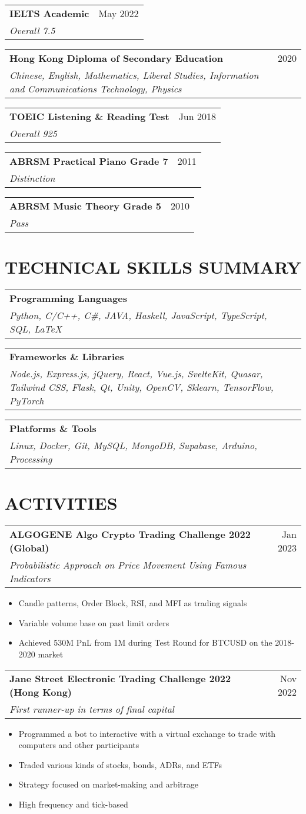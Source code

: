 \documentclass{article}
\newcommand{\jobTitle}[3]{
\begin{tabularx}{\linewidth}{ X r }
    \textbf{#1} & #2\\
    \textit{#3} &
\end{tabularx}
}
\begin{document}
\jobTitle
{IELTS Academic}
{May 2022}
{Overall 7.5}

\jobTitle
{Hong Kong Diploma of Secondary Education}
{2020}
{Chinese, English, Mathematics, Liberal Studies, Information and Communications Technology, Physics}

\jobTitle
{TOEIC Listening \& Reading Test}
{Jun 2018}
{Overall 925}

\jobTitle
{ABRSM Practical Piano Grade 7}
{2011}
{Distinction}

\jobTitle
{ABRSM Music Theory Grade 5}
{2010}
{Pass}

\section{TECHNICAL SKILLS SUMMARY}

\jobTitle
{Programming Languages}
{}
{Python, C/C++, C\#, JAVA, Haskell, JavaScript, TypeScript, SQL, \LaTeX}

\jobTitle
{Frameworks \& Libraries}
{}
{Node.js, Express.js, jQuery, React, Vue.js, SvelteKit, Quasar, Tailwind CSS, Flask, Qt, Unity, OpenCV, Sklearn, TensorFlow, PyTorch}

\jobTitle
{Platforms \& Tools}
{}
{Linux, Docker, Git, MySQL, MongoDB, Supabase, Arduino, Processing}

\section{ACTIVITIES}

\jobTitle
{ALGOGENE Algo Crypto Trading Challenge 2022 (Global)}
{Jan 2023}
{Probabilistic Approach on Price Movement Using Famous Indicators}
\begin{itemize}
    \item Candle patterns, Order Block, RSI, and MFI as trading signals
    \item Variable volume base on past limit orders
    \item Achieved 530M PnL from 1M during Test Round for BTCUSD on the 2018-2020 market
\end{itemize}

\jobTitle
{Jane Street Electronic Trading Challenge 2022 (Hong Kong)}
{Nov 2022}
{First runner-up in terms of final capital}
\begin{itemize}
    \item Programmed a bot to interactive with a virtual exchange to trade with computers and other participants
    \item Traded various kinds of stocks, bonds, ADRs, and ETFs
    \item Strategy focused on market-making and arbitrage
    \item High frequency and tick-based
\end{itemize}
\end{document}
